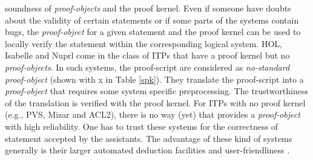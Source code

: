 soundness of {\em proof-objects} and the proof kernel. 
Even if someone have doubts about the validity of certain statements or if some parts of the systems contain bugs, the {\em proof-object} for a given statement 
and the proof kernel can be used to locally verify the statement within the corresponding logical system.
HOL, Isabelle and Nuprl come in the class of ITPs that have a proof kernel but no {\em proof-objects}. In such systems, the 
proof-script are considered 
as {\em no-standard proof-object} (shown with x in Table \ref{spk}). They translate the proof-script into a {\em proof-object} that requires some system specific 
preprocessing. The trustworthiness of the translation is verified with the proof kernel. For ITPs with no proof kernel (e.g., PVS, Mizar and ACL2), 
there is no way (yet) that provides a {\em proof-object} with high reliability. One has to trust these systems for the correctness of statement accepted by the 
assistants. The advantage of these kind of systems generally is their larger automated deduction facilities and user-friendliness .

